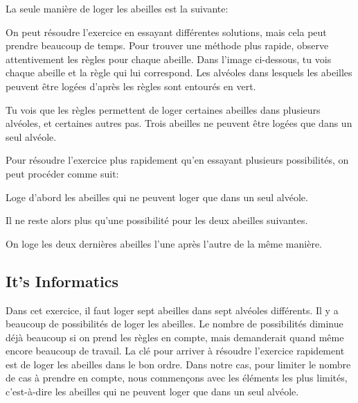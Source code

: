 \documentclass[a4paper,11pt]{report}
\newcommand{\taskGraphicsFolder}{..}
\begin{document}
La seule manière de loger les abeilles est la suivante:

{\centering%
\par}

On peut résoudre l’exercice en essayant différentes solutions, mais cela peut prendre beaucoup de temps. Pour trouver une méthode plus rapide, observe attentivement les règles pour chaque abeille. Dans l’image ci-dessous, tu vois chaque abeille et la règle qui lui correspond. Les alvéoles dans lesquels les abeilles peuvent être logées d’après les règles sont entourés en vert.

{\centering%
\par}

Tu vois que les règles permettent de loger certaines abeilles dans plusieurs alvéoles, et certaines autres pas. Trois abeilles ne peuvent être logées que dans un seul alvéole.

Pour résoudre l’exercice plus rapidement qu’en essayant plusieurs possibilités, on peut procéder comme suit:

Loge d’abord les abeilles qui ne peuvent loger que dans un seul alvéole.

{\centering%
\par}

Il ne reste alors plus qu’une possibilité pour les deux abeilles suivantes.

{\centering%
\par}

On loge les deux dernières abeilles l’une après l’autre de la même manière.


\subsection*{It’s Informatics}

Dans cet exercice, il faut loger sept abeilles dans sept alvéoles différents. Il y a beaucoup de possibilités de loger les abeilles. Le nombre de possibilités diminue déjà beaucoup si on prend les règles en compte, mais demanderait quand même encore beaucoup de travail. La clé pour arriver à résoudre l’exercice rapidement est de loger les abeilles dans le bon ordre. Dans notre cas, pour limiter le nombre de cas à prendre en compte, nous commençons avec les éléments les plus limités, c’est-à-dire les abeilles qui ne peuvent loger que dans un seul alvéole.
\end{document}

